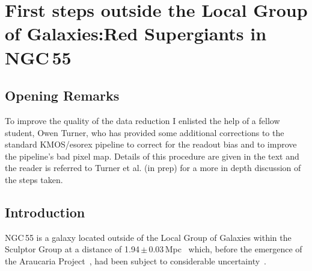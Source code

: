 \chapter{First steps outside the Local Group of Galaxies:Red Supergiants in NGC\,55}
\label{ch:ngc55}





\section{Opening Remarks} %
\label{sec:ngc55open}

To improve the quality of the data reduction I enlisted the help of a fellow student, Owen Turner, who has provided some additional corrections to the standard KMOS/esorex pipeline to correct for the readout bias and to improve the pipeline's bad pixel map.
Details of this procedure are given in the text and the reader is referred to Turner et al. (in prep) for a more in depth discussion of the steps taken.

\section{Introduction} %
\label{sec:ngc55intro}

NGC\,55 is a galaxy located outside of the Local Group of Galaxies within the Sculptor Group at a distance of 1.94\,$\pm$\,0.03\,Mpc~\citep{2006AJ....132.2556P,2008ApJ...672..266G} which, before the emergence of the Araucaria Project~\citep{2005Msngr.121...23G}, had been subject to considerable uncertainty~\citep[e.g.][]{1987ApJ...323...79P,2006A&A...455..891V}.

